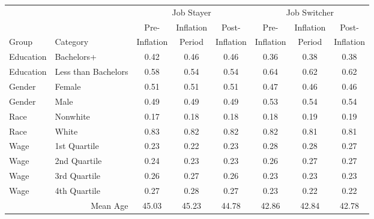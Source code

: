\begin{table}[htbp]
\centering
\label{tab:demographic_stability}
\begin{tabular}{llcccccc}
\toprule
\toprule
 &  & \multicolumn{3}{c}{Job Stayer} & \multicolumn{3}{c}{Job Switcher} \\
\cmidrule(lr){3-5} \cmidrule(lr){6-8}
  &  & Pre- & Inflation & Post- & Pre- & Inflation & Post- \\
 Group &Category & Inflation & Period & Inflation & Inflation & Period & Inflation \\
\midrule
Education & Bachelors+ & 0.42 & 0.46 & 0.46 & 0.36 & 0.38 & 0.38 \\
Education & Less than Bachelors & 0.58 & 0.54 & 0.54 & 0.64 & 0.62 & 0.62 \\
Gender & Female & 0.51 & 0.51 & 0.51 & 0.47 & 0.46 & 0.46 \\
Gender & Male & 0.49 & 0.49 & 0.49 & 0.53 & 0.54 & 0.54 \\
Race & Nonwhite & 0.17 & 0.18 & 0.18 & 0.18 & 0.19 & 0.19 \\
Race & White & 0.83 & 0.82 & 0.82 & 0.82 & 0.81 & 0.81 \\
Wage & 1st Quartile & 0.23 & 0.22 & 0.23 & 0.28 & 0.28 & 0.27 \\
Wage & 2nd Quartile & 0.24 & 0.23 & 0.23 & 0.26 & 0.27 & 0.27 \\
Wage & 3rd Quartile & 0.26 & 0.27 & 0.26 & 0.23 & 0.23 & 0.23 \\
Wage & 4th Quartile & 0.27 & 0.28 & 0.27 & 0.23 & 0.22 & 0.22 \\
\midrule
 & \multicolumn{1}{r}{Mean Age} & 45.03 & 45.23 & 44.78 & 42.86 & 42.84 & 42.78\\
\bottomrule
\bottomrule
\end{tabular}

\vspace{1em}
\end{table}
